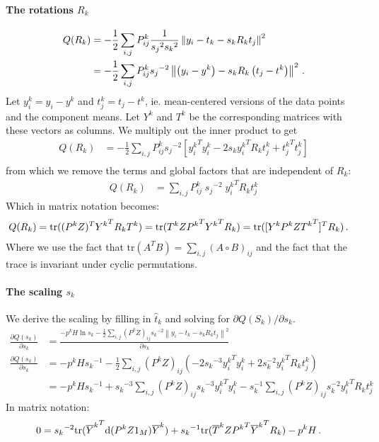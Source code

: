 \paragraph{The rotations $R_k$}
\begin{align*} 
Q(R_k) &= - \frac{1}{2}\sum_{i,j} P^k_{ij} \frac{1}{{s_j}^2{s_k}^2} \left\| y_i - t_k - s_kR_k t_j \right\|^2\\
&= - \frac{1}{2}\sum_{i,j} P^k_{ij} {s_j}^{-2} \left\| \left(y_i - y^k\right) - s_kR_k \left(t_j-t^k\right) \right\|^2 \,\text{.} 
\end{align*}
Let ${y^k_i} = y_i - y^k$ and ${t^k_j} = t_j - t^k$, ie. mean-centered versions of the data points and the component means. Let $Y^k$ and ${T^k}$ be the corresponding matrices with these vectors as columns. We multiply out the inner product to get
\begin{align*}
Q(R_k) &= - \frac{1}{2}\sum_{i,j} P^k_{ij} {s_j}^{-2} \left[ {y_i^k}^T{y_i^k} - 2 s_k {y_i^k}^TR_k{t_j^k} + {t_j^k}^T{t_j^k} \right] \\
\end{align*}
from which we remove the terms and global factors that are independent of $R_k$:
\begin{align*}
Q(R_k)&= \sum_{i,j} P^k_{ij}\; {s_j}^{-2}\; {y_i^k}^TR_k{t_j^k}
\end{align*}
Which in matrix notation becomes:
\begin{align*} 
Q(R_k) &= \text{tr}((P^k Z)^T {Y^k}^TR_kT^k) = \text{tr}(T^k Z {P^k}^T{Y^k}^TR_k) = \text{tr}([Y^kP^kZ{T^k}^T]^TR_k) \,\text{.}
\end{align*}
Where we use the fact that $\text{tr}(A^TB) = \sum_{i,j}(A\circ B)_{ij}$ and the fact that the trace is invariant under cyclic permutations.

\paragraph{The scaling $s_k$}
We derive the scaling by filling in $\hat t_k$ and solving for $\partial Q(S_k)/\partial s_k$.
\begin{align*}
\frac{\partial Q(s_k)}{\partial s_k} &=  \frac{- p^k H \ln s_k - \frac{1}{2}\sum_{i,j} (P^kZ)_{ij} {s_k}^{-2} \left\|y_i - t_k - s_k R_k t_j \right\|^2}{\partial s_k}\\
\frac{\partial Q(s_k)}{\partial s_k} &= - p^k H {s_k}^{-1} - \frac{1}{2}\sum_{i,j} (P^kZ)_{ij} \left(-2{s_k}^{-3} {y^k_i}^T y^k_i + 2{s_k^{-2}} {y^k_i}^TR_kt_j^k \right) \\
&= -p^k H {s_k}^{-1} + {s_k}^{-3} \sum_{i, j} (P^kZ)_{ij}{s_k}^{-3} {y^k_i}^T y^k_i - s_k^{-1} \sum_{i, j}(P^kZ)_{ij}{s_k^{-2}} {y^k_i}^TR_kt_j^k
\end{align*}
In matrix notation:
\begin{align*}
0 &= {s_k}^{-2} \text{tr}({\overline{Y}^k}^T\text{d}(P^kZ1_M)\overline{Y}^k) + {s_k}^{-1} \text{tr}(\overline{T}^kZ{P^k}^T{\overline{Y}^k}^TR_k) -p^k H \,\text{.}
\end{align*}